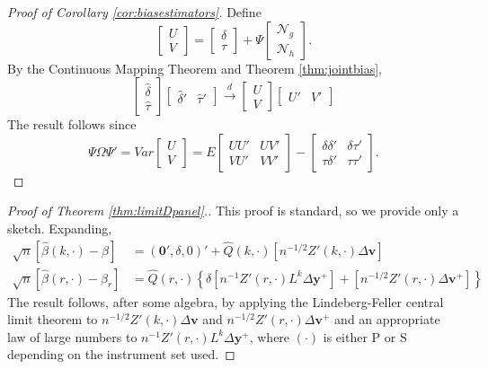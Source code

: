 \begin{proof}[Proof of Corollary \ref{cor:biasestimators}]
Define
	$$\left[\begin{array}{c} U\\ V \end{array}\right]=\left[\begin{array}{c}\delta\\ \tau\end{array} \right] +\Psi\left[\begin{array}{c}\mathscr{N}_g \\ \mathscr{N}_h \end{array}\right].$$
By the Continuous Mapping Theorem and Theorem \ref{thm:jointbias},
	$$\left[\begin{array}{c} \widehat{\delta} \\ \widehat{\tau} \end{array}\right]\left[\begin{array}{cc} \widehat{\delta}' & \widehat{\tau}'\end{array} \right] \overset{d}{\rightarrow} \left[\begin{array}{c} U\\V \end{array}\right]\left[\begin{array}{cc}U' & V'\end{array} \right] $$
The result follows since
$$\Psi\Omega\Psi' =Var\left[\begin{array}{c}U\\V\end{array}\right] = 
E\left[\begin{array}{cc} 
				UU'&UV'\\
				VU'&VV'
				\end{array}\right] - 
				\left[\begin{array}{cc}
				\delta\delta'&\delta\tau'\\
				\tau\delta'&\tau\tau'
				\end{array}\right].$$
\end{proof}


\begin{proof}[Proof of Theorem \ref{thm:limitDpanel}.]
  This proof is standard, so we provide only a sketch.
Expanding, 
\begin{align*}
  \sqrt{n}\left[\widehat{\beta}(k,\cdot) - \beta\right] &=(\mathbf{0}', \delta, 0)' + \widehat{Q}(k,\cdot)\left[ n^{-1/2}Z'(k,\cdot)\Delta \mathbf{v}\right]\\
  \sqrt{n}\left[\widehat{\beta}(r,\cdot) - \beta_{r}\right] &=  \widehat{Q}(r,\cdot)\left\{ \delta \left[n^{-1}Z'(r,\cdot) L^{k}\Delta \mathbf{y}^+\right] + \left[n^{-1/2}Z'(r,\cdot)\Delta \mathbf{v}^{+}\right] \right\}
\end{align*}
The result follows, after some algebra, by applying the Lindeberg-Feller central limit theorem to $n^{-1/2}Z'(k,\cdot)\Delta \mathbf{v}$ and $n^{-1/2}Z'(r,\cdot)\Delta \mathbf{v}^{+}$ and an appropriate law of large numbers to $n^{-1} Z'(r,\cdot)L^k \Delta \mathbf{y}^{+}$, where $(\cdot)$ is either $\text{P}$ or $\text{S}$ depending on the instrument set used.
\end{proof}



